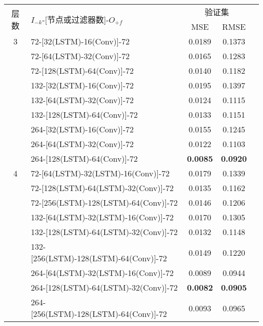 \begin{table}[!htbp]
  \centering
  \label{tab:ss_number_out_72}
  \footnotesize
  \renewcommand{\arraystretch}{1}
  \begin{tabular}{clccc}
    \toprule
    \multirow{2}{*}{层数} & \multirow{2}{*}{$I_{-k}$-[节点或过滤器数]-$O_{+f}$} & \multicolumn{2}{c}{验证集}\\
    \cmidrule(lr){3-4}
    \noalign{\smallskip}
    & & MSE & RMSE\\
    \midrule 
    3 & 72-[32(LSTM)-16(Conv)]-72 & 0.0189 & 0.1373 \\ 
      & 72-[64(LSTM)-32(Conv)]-72 & 0.0165 & 0.1283 \\
      & 72-[128(LSTM)-64(Conv)]-72 & 0.0140 & 0.1182 \\
      & 132-[32(LSTM)-16(Conv)]-72 & 0.0195 & 0.1397 \\
      & 132-[64(LSTM)-32(Conv)]-72 & 0.0124 & 0.1115 \\
      & 132-[128(LSTM)-64(Conv)]-72 & 0.0133 & 0.1151 \\
      & 264-[32(LSTM)-16(Conv)]-72 & 0.0155 & 0.1245 \\
      & 264-[64(LSTM)-32(Conv)]-72 & 0.0122 & 0.1103 \\
      & 264-[128(LSTM)-64(Conv)]-72 & \textbf{0.0085} & \textbf{0.0920} \\
    \hline
    4 & 72-[64(LSTM)-32(LSTM)-16(Conv)]-72 & 0.0179 & 0.1339 \\
      & 72-[128(LSTM)-64(LSTM)-32(Conv)]-72 & 0.0135 & 0.1162  \\
      & 72-[256(LSTM)-128(LSTM)-64(Conv)]-72 & 0.0146 & 0.1206 \\
      & 132-[64(LSTM)-32(LSTM)-16(Conv)]-72 & 0.0170 & 0.1305 \\
      & 132-[128(LSTM)-64(LSTM)-32(Conv)]-72 & 0.0132 & 0.1148 \\
      & 132-[256(LSTM)-128(LSTM)-64(Conv)]-72 & 0.0149 & 0.1220 \\
      & 264-[64(LSTM)-32(LSTM)-16(Conv)]-72 & 0.0089 & 0.0944 \\
      & 264-[128(LSTM)-64(LSTM)-32(Conv)]-72 & \textbf{0.0082} & \textbf{0.0905} \\
      & 264-[256(LSTM)-128(LSTM)-64(Conv)]-72 & 0.0093 & 0.0965 \\
    \hline

\end{tabular}
\end{table}
